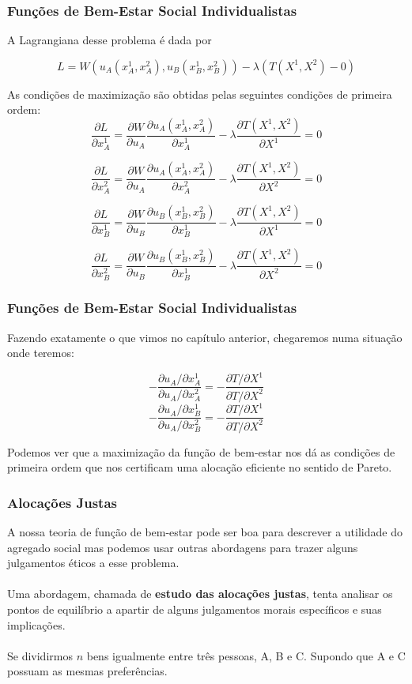 \documentclass{beamer}[10]
\begin{document}
\begin{frame}
	\frametitle{Funções de Bem-Estar Social Individualistas}

	A Lagrangiana desse problema é dada por

	$$ L = W(u_A(x_A^1,x_A^2),u_B(x_B^1,x_B^2)) - \lambda(T(X^1,X^2) - 0) $$

	As condições de maximização são obtidas pelas seguintes condições de primeira ordem:
	\small
	$$ \frac{\partial L}{\partial x_A^1} = \frac{\partial W}{\partial u_A} \frac{\partial u_A(x_A^1,x_A^2)}{\partial x_A^1} - \lambda \frac{\partial T(X^1,X^2)}{\partial X^1} = 0 $$

	$$ \frac{\partial L}{\partial x_A^2} = \frac{\partial W}{\partial u_A} \frac{\partial u_A(x_A^1,x_A^2)}{\partial x_A^2} - \lambda \frac{\partial T(X^1,X^2)}{\partial X^2} = 0 $$

	$$ \frac{\partial L}{\partial x_B^1} = \frac{\partial W}{\partial u_B} \frac{\partial u_B(x_B^1,x_B^2)}{\partial x_B^1} - \lambda \frac{\partial T(X^1,X^2)}{\partial X^1} = 0 $$

	$$ \frac{\partial L}{\partial x_B^2} = \frac{\partial W}{\partial u_B} \frac{\partial u_B(x_B^1,x_B^2)}{\partial x_B^1} - \lambda \frac{\partial T(X^1,X^2)}{\partial X^2} = 0 $$
	\normalsize
\end{frame}

\begin{frame}
	\frametitle{Funções de Bem-Estar Social Individualistas}

	Fazendo exatamente o que vimos no capítulo anterior, chegaremos numa situação onde teremos:

	$$ - \frac{\partial u_A / \partial x_A^1}{\partial u_A / \partial x_A^2} = - \frac{\partial T / \partial X^1}{\partial T / \partial X^2} $$
	$$ - \frac{\partial u_A / \partial x_B^1}{\partial u_A / \partial x_B^2} = - \frac{\partial T / \partial X^1}{\partial T / \partial X^2} $$
	
	Podemos ver que a maximização da função de bem-estar nos dá as condições de primeira ordem que nos certificam uma alocação eficiente no sentido de Pareto.

\end{frame}

\begin{frame}
	\frametitle{Alocações Justas}

	A nossa teoria de função de bem-estar pode ser boa para descrever a utilidade do agregado social mas podemos usar outras abordagens para trazer alguns julgamentos éticos a esse problema.
	\\~\\
	Uma abordagem, chamada de \textbf{estudo das alocações justas}, tenta analisar os pontos de equilíbrio a apartir de alguns julgamentos morais específicos e suas implicações.
	\\~\\
	Se dividirmos $n$ bens igualmente entre três pessoas, A, B e C. Supondo que A e C possuam as mesmas preferências.	

\end{frame}
\end{document}
